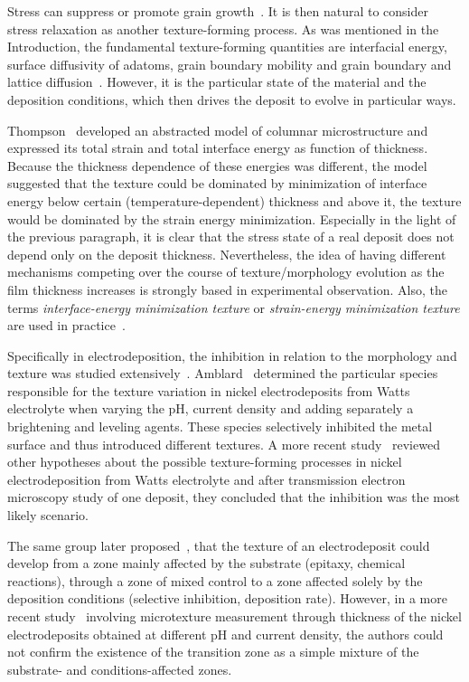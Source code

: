 Stress can suppress or promote grain growth~\cite{Thompson1993}. It is then natural to consider stress relaxation as another texture-forming process. As was mentioned in the Introduction, the fundamental texture-forming quantities are interfacial energy, surface diffusivity of adatoms, grain boundary mobility and grain boundary and lattice diffusion~\cite{Szpunar1997, Suwas2014}. However, it is the particular state of the material and the deposition conditions, which then drives the deposit to evolve in particular ways.

Thompson~\cite{Thompson1993} developed an abstracted model of columnar microstructure and expressed its total strain and total interface energy as function of thickness. Because the thickness dependence of these energies was different, the model suggested that the texture could be dominated by minimization of interface energy below certain (temperature-dependent) thickness and above it, the texture would be dominated by the strain energy minimization. Especially in the light of the previous paragraph, it is clear that the stress state of a real deposit does not depend only on the deposit thickness. Nevertheless, the idea of having different mechanisms competing over the course of texture/morphology evolution as the film thickness increases is strongly based in experimental observation. Also, the terms \textit{interface-energy minimization texture} or \textit{strain-energy minimization texture} are used in practice~\cite{Alimadadi2016}.

Specifically in electrodeposition, the inhibition in relation to the morphology and texture was studied extensively~\cite{Winand1992}. Amblard~\cite{Amblard1979} determined the particular species responsible for the texture variation in nickel electrodeposits from Watts electrolyte when varying the pH, current density and adding separately a brightening and leveling agents. These species selectively inhibited the metal surface and thus introduced different textures. A more recent study~\cite{BergenstofNielsen1997} reviewed other hypotheses about the possible texture-forming processes in nickel electrodeposition from Watts electrolyte and after transmission electron microscopy study of one deposit, they concluded that the inhibition was the most likely scenario. 

The same group later proposed~\cite{Rasmussen2001}, that the texture of an electrodeposit could develop from a zone mainly affected by the substrate (epitaxy, chemical reactions), through a zone of mixed control to a zone affected solely by the deposition conditions (selective inhibition, deposition rate). However, in a more recent study~\cite{Alimadadi2016} involving microtexture measurement through thickness of the nickel electrodeposits obtained at different pH and current density, the authors could not confirm the existence of the transition zone as a simple mixture of the substrate- and conditions-affected zones. 



